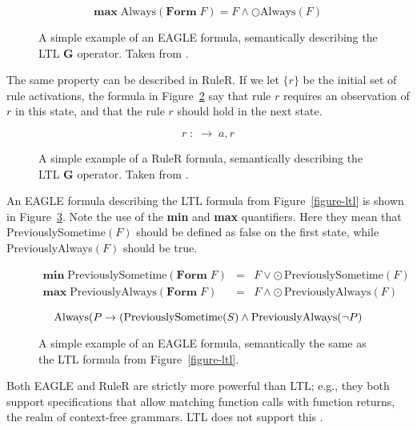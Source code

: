 \documentclass[a4paper,11pt]{kth-mag}
\begin{document}
\begin{figure}[h!]
	\[
  \textbf{max} \; \text{Always}(\textbf{Form} \; F) = F \wedge \bigcirc \text{Always}(F)
	\]

	\caption{A simple example of an EAGLE formula, semantically describing the
  LTL $\boldsymbol{G}$ operator. Taken from \cite{barringer03eagle}.}
	\label{figure-eagle-always}
\end{figure}

The same property can be described in RuleR. If we let $\{r\}$ be the initial
set of rule activations, the formula in Figure~\ref{figure-ruler-always} say
that rule $r$ requires an observation of $r$ in this state, and that the rule
$r$ should hold in the next state.

\begin{figure}[h!]
	\[
    r \; : \; \rightarrow \; a,r
	\]

	\caption{A simple example of a RuleR formula, semantically describing the
  LTL $\boldsymbol{G}$ operator. Taken from \cite{barringer07ruler}.}
	\label{figure-ruler-always}
\end{figure}

An EAGLE formula describing the LTL formula from Figure~\ref{figure-ltl} is
shown in Figure~\ref{figure-eagle-ltl}. Note the use of the \textbf{min} and
\textbf{max} quantifiers. Here they mean that PreviouslySometime$(F)$ should be
defined as false on the first state, while PreviouslyAlways$(F)$ should be
true.


\begin{figure}[h!]
  \[
  \begin{array}{rcl}
    \textbf{min} \; \text{PreviouslySometime}(\textbf{Form} \; F) & = & F \vee \odot \, \text{PreviouslySometime}(F) \\
      \textbf{max} \; \text{PreviouslyAlways}(\textbf{Form} \; F) & = & F \wedge \odot \, \text{PreviouslyAlways}(F) \\
  \end{array}
  \]
  \[
    \text{Always}(P \rightarrow (\text{PreviouslySometime}(S) \wedge \text{PreviouslyAlways}(\neg P) \\
  \]

	\caption{A simple example of an EAGLE formula, semantically the same as the
  LTL formula from Figure~\ref{figure-ltl}.}
	\label{figure-eagle-ltl}
\end{figure}

Both EAGLE and RuleR are strictly more powerful than LTL; e.g., they both
support specifications that allow matching function calls with function
returns, the realm of context-free grammars. LTL does not support this
\cite{barringer03eagle,barringer07ruler}.
\end{document}
